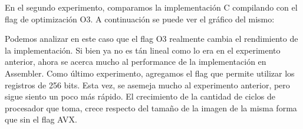 \documentclass[a4paper]{article}
\begin{document}
En el segundo experimento, comparamos la implementación C compilando con el flag de optimización O3. A continuación se puede ver el gráfico del mismo:

\begin{centering}
\end{centering}


Podemos analizar en este caso que el flag O3 realmente cambia el rendimiento de la implementación. Si bien ya no es tán lineal como lo era en el
experimento anterior, ahora se acerca mucho al performance de la implementación en Assembler.
\newline
Como último experimento, agregamos el flag que permite utilizar los registros de 256 bits. Esta vez, se asemeja mucho al experimento anterior, pero
sigue siento un poco más rápido. El crecimiento de la cantidad de ciclos de procesador que toma, crece respecto del tamaño de la imagen de la misma
forma que sin el flag AVX.
\end{document}
